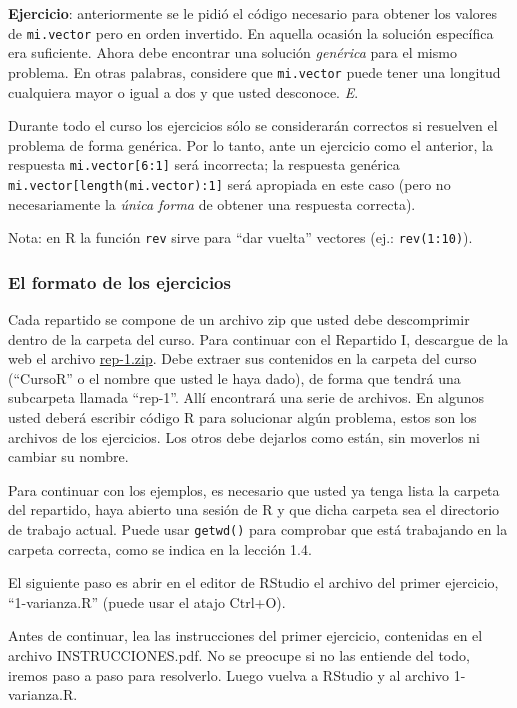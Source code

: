 \documentclass[]{article}
\begin{document}
\textbf{Ejercicio}: anteriormente se le pidió el código necesario para
obtener los valores de \texttt{mi.vector} pero en orden invertido. En
aquella ocasión la solución específica era suficiente. Ahora debe
encontrar una solución \emph{genérica} para el mismo problema. En otras
palabras, considere que \texttt{mi.vector} puede tener una longitud
cualquiera mayor o igual a dos y que usted desconoce. \emph{E}.

Durante todo el curso los ejercicios sólo se considerarán correctos si
resuelven el problema de forma genérica. Por lo tanto, ante un ejercicio
como el anterior, la respuesta \texttt{mi.vector{[}6:1{]}} será
incorrecta; la respuesta genérica
\texttt{mi.vector{[}length(mi.vector):1{]}} será apropiada en este caso
(pero no necesariamente la \emph{única forma} de obtener una respuesta
correcta).

Nota: en R la función \texttt{rev} sirve para ``dar vuelta'' vectores
(ej.: \texttt{rev(1:10)}).

\subsubsection{El formato de los ejercicios}

Cada repartido se compone de un archivo zip que usted debe descomprimir
dentro de la carpeta del curso. Para continuar con el Repartido I,
descargue de la web el archivo \href{http://goo.gl/2evbBS}{rep-1.zip}.
Debe extraer sus contenidos en la carpeta del curso (``CursoR'' o el
nombre que usted le haya dado), de forma que tendrá una subcarpeta
llamada ``rep-1''. Allí encontrará una serie de archivos. En algunos
usted deberá escribir código R para solucionar algún problema, estos son
los archivos de los ejercicios. Los otros debe dejarlos como están, sin
moverlos ni cambiar su nombre.

Para continuar con los ejemplos, es necesario que usted ya tenga lista
la carpeta del repartido, haya abierto una sesión de R y que dicha
carpeta sea el directorio de trabajo actual. Puede usar \texttt{getwd()}
para comprobar que está trabajando en la carpeta correcta, como se
indica en la lección 1.4.

El siguiente paso es abrir en el editor de RStudio el archivo del primer
ejercicio, ``1-varianza.R'' (puede usar el atajo Ctrl+O).

Antes de continuar, lea las instrucciones del primer ejercicio,
contenidas en el archivo INSTRUCCIONES.pdf. No se preocupe si no las
entiende del todo, iremos paso a paso para resolverlo. Luego vuelva a
RStudio y al archivo 1-varianza.R.
\end{document}
